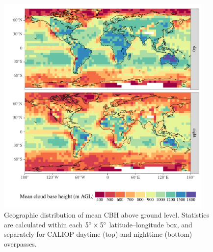 \documentclass[essd,manuscript]{copernicus}\usepackage[]{graphicx}\usepackage[]{color}
\newenvironment{knitrout}{}{} %
\begin{document}
\begin{figure}
  \centering
\begin{knitrout}
\color{fgcolor}

{\centering \includegraphics[width=0.95\textwidth]{figure/method-cbase-base-1} 

}



\end{knitrout}
  \caption{Geographic distribution of mean CBH above ground
    level.  Statistics are calculated within each $5^{\circ}\times 5^{\circ}$
    latitude--longitude box, and separately for CALIOP daytime (top) and
  nighttime (bottom)
    overpasses.}
  \label{fig:geo}
\end{figure}

\end{document}
